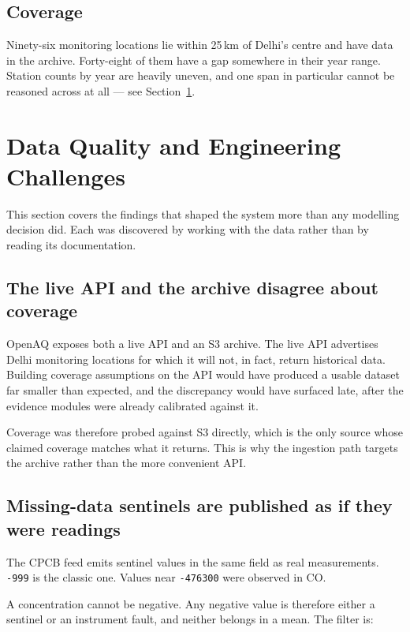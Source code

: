 \documentclass[11pt,a4paper]{article}
\newcommand{\code}[1]{\texttt{\small #1}}
\begin{document}
\subsection{Coverage}

Ninety-six monitoring locations lie within 25\,km of Delhi's centre and have data in
the archive. Forty-eight of them have a gap somewhere in their year range. Station
counts by year are heavily uneven, and one span in particular cannot be reasoned
across at all --- see Section~\ref{sec:dataquality}.

\section{Data Quality and Engineering Challenges}
\label{sec:dataquality}

This section covers the findings that shaped the system more than any modelling
decision did. Each was discovered by working with the data rather than by reading
its documentation.

\subsection{The live API and the archive disagree about coverage}

OpenAQ exposes both a live API and an S3 archive. The live API advertises Delhi
monitoring locations for which it will not, in fact, return historical data.
Building coverage assumptions on the API would have produced a usable dataset far
smaller than expected, and the discrepancy would have surfaced late, after the
evidence modules were already calibrated against it.

Coverage was therefore probed against S3 directly, which is the only source whose
claimed coverage matches what it returns. This is why the ingestion path targets
the archive rather than the more convenient API.

\subsection{Missing-data sentinels are published as if they were readings}

The CPCB feed emits sentinel values in the same field as real measurements.
\code{-999} is the classic one. Values near \code{-476300} were observed in CO.

A concentration cannot be negative. Any negative value is therefore either a
sentinel or an instrument fault, and neither belongs in a mean. The filter is:
\end{document}
